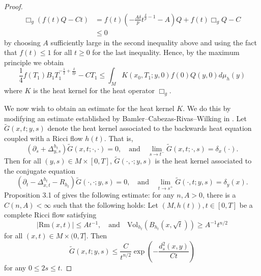 \documentclass[12pt]{amsart}
\theoremstyle{plain}
\theoremstyle{plain}
\theoremstyle{definition}
\theoremstyle{remark}
\numberwithin{equation}{subsection}
\begin{document}
\begin{proof}
\begin{align}
        \Box_g\left(f(t)Q-Ct\right) &= f(t)\left(-\frac{A\delta}{p}t^{\frac{\delta}{p}-1} - A\right)Q + f(t)\Box_g Q - C \nonumber \\
        & \leq 0
    \end{align}
    by choosing $A$ sufficiently large in the second inequality above and using the fact that $f(t) \leq 1$ for all $t \geq 0$ for the last inequality.
    Hence, by the maximum principle we obtain
    \begin{equation}\label{eqn:gradient-estimate-invoke-heat-kernel}
        \frac14 f(T_1)B_1T_1^{-\frac{1}{2}+\frac{\delta}{2p}} - CT_1 \leq \int_{M} K(x_0, T_1; y, 0)f(0)Q(y,0)d\mu_h(y)
    \end{equation}
    where $K$ is the heat kernel for the heat operator $\Box_g$.
    
    We now wish to obtain an estimate for the heat kernel $K$. We do this by modifying an estimate established by Bamler--Cabezas-Rivas--Wilking in \cite{bamler_ricci_2017}. Let $\widetilde{G}(x,t;y,s)$ denote the heat kernel associated to the backwards heat equation coupled with a Ricci flow $h(t)$. That is,
    \begin{equation*}
        \left(\partial_s + \Delta^{h_t}_{y,s}\right)\widetilde{G}(x,t;\cdot,\cdot) = 0,\quad \text{and} \quad \lim\limits_{s\to t^-}\widetilde{G}(x,t;\cdot,s) = \delta_x(\cdot).
    \end{equation*}
    Then for all $(y,s) \in M \times [0,T]$, $\widetilde{G}(\cdot,\cdot;y,s)$ is the heat kernel associated to the conjugate equation
    \begin{equation*}
        \left(\partial_t - \Delta^{h_t}_{x,t} - R_{h_t}\right)\widetilde{G}(\cdot,\cdot;y,s) = 0,\quad \text{and} \quad \lim\limits_{t\to s^+}\widetilde{G}(\cdot,t;y,s) = \delta_y(x).
    \end{equation*}
    Proposition 3.1 of \cite{bamler_ricci_2017} gives the following estimate: for any $n, A > 0$, there is a $C(n,A) < \infty$ such that the following holds: Let $(M, h(t)), t\in[0,T]$ be a complete Ricci flow satisfying
    \begin{equation}\label{eqn:BCW-estimate-heat-kernel-assumptions}
        |\text{Rm}(x,t)| \leq At^{-1},\quad \text{and} \quad \text{Vol}_{h_t}\left(B_{h_t}(x,\sqrt{t})\right) \geq A^{-1}t^{n/2}
    \end{equation}
    for all $(x,t)\in M\times(0,T]$. Then
    \begin{equation}\label{eqn:BCW-estimate}
        \widetilde{G}(x,t;y,s) \leq \frac{C}{t^{n/2}}\exp{\left(-\frac{d^2_s(x,y)}{Ct}\right)}
    \end{equation}
    for any $0 \leq 2s \leq t$. 
    

\end{proof}
\end{document}

